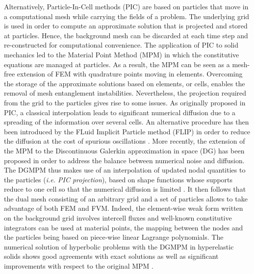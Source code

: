 Alternatively, Particle-In-Cell methods (PIC) \cite{PIC} are based on particles that move in a computational mesh while carrying the fields of a problem.
The underlying grid is used in order to compute an approximate solution that is projected and stored at particles.
Hence, the background mesh can be discarded at each time step and re-constructed for computational convenience.
The application of PIC to solid mechanics led to the Material Point Method (MPM) \cite{Sulsky94} in which the constitutive equations are managed at particles.
As a result, the MPM can be seen as a mesh-free extension of FEM with quadrature points moving in elements.
Overcoming the storage of the approximate solutions based on elements, or cells, enables the removal of mesh entanglement instabilities.
Nevertheless, the projection required from the grid to the particles gives rise to some issues.
As originally proposed in PIC, a classical interpolation leads to significant numerical diffusion due to a spreading of the information over several cells.
An alternative procedure has then been introduced by the FLuid Implicit Particle method (FLIP) \cite{FLIP0} in order to reduce the diffusion at the cost of spurious oscillations \cite{XPIC}.
More recently, the extension of the MPM to the Discontinuous Galerkin approximation in space (DG) \cite{NeutronDG} has been proposed in order to address the balance between numerical noise and diffusion.
The DGMPM \cite{DGMPM} thus makes use of an interpolation of updated nodal quantities to the particles (\textit{i.e. PIC projection}), based on shape functions whose supports reduce to one cell so that the numerical diffusion is limited \cite{Thesis}.
It then follows that the dual mesh consisting of an arbitrary grid and a set of particles allows to take advantage of both FEM and FVM.
Indeed, the element-wise weak form written on the background grid involves intercell fluxes and well-known constitutive integrators \cite{Simo} can be used at material points, the mapping between the nodes and the particles being based on piece-wise linear Lagrange polynomials.
The numerical solution of hyperbolic problems with the DGMPM in hyperelastic solids shows good agreements with exact solutions as well as significant improvements with respect to the original MPM \cite{DGMPM}.


